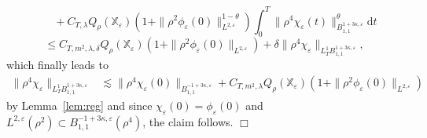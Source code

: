 \documentclass[a4paper,11pt]{article}
\newcommand{\mathd}{\mathrm{d}}
\numberwithin{equation}{section}
\begin{document}
     \[ \qquad +C_{T,\lambda} Q_{\rho} (\mathbb{X}_{\varepsilon}) ( 1+\|
     \rho^2 \phi_{\varepsilon} (0)\|^{1 - \theta}_{L^{2, \varepsilon}})
     \int_0^T \| \rho^4 \chi_{\varepsilon} (t) \|_{B^{1 + 3 \kappa,
     \varepsilon}_{1, 1}}^{\theta} \mathd t \]
  \[ \leqslant C_{T,m^{2},\lambda,\delta}  Q_{\rho} (\mathbb{X}_{\varepsilon}) (1 +\| \rho^2 \phi_{
     \varepsilon} (0)\|_{L^{2, \varepsilon}}) + \delta \| \rho^4
     \chi_{\varepsilon} \|_{L^1_T B_{1, 1}^{1 + 3 \kappa, \varepsilon}}, \]
  which finally leads to
  \[ 
  \begin{aligned}
  \| \rho^4 \chi_{\varepsilon} \|_{L^1_T B_{1, 1}^{1 + 3 \kappa,
     \varepsilon}} & \lesssim \| \rho^4 \chi_{\varepsilon} (0) \|_{B_{1, 1}^{- 1
     + 3 \kappa, \varepsilon}}  +C_{T,m^{2},\lambda}  Q_{\rho} (\mathbb{X}_{\varepsilon}) (1 +\| \rho^2 \phi_{
     \varepsilon} (0)\|_{L^{2, \varepsilon}})
  \end{aligned}
    \]
  by Lemma~\ref{lem:reg} and since $\chi_{\varepsilon} (0) = \phi_{\varepsilon}
  (0)$ and $L^{2, \varepsilon} (\rho^2) \subset B_{1, 1}^{- 1 + 3 \kappa,
  \varepsilon} (\rho^4)$, the claim follows.
\hspace*{\fill}$\Box$\medskip





%
%
\end{document}
